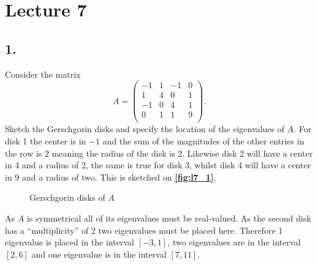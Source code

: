 \section*{Lecture 7}

\subsection*{1.} Consider the matrix
\[ 
A = \begin{pmatrix}
-1 & 1 & -1 & 0\\
1 & 4 & 0 & 1\\
-1 & 0 & 4 & 1\\
0 & 1 & 1 & 9\\
\end{pmatrix}
.\]
Sketch the Gerschgorin disks and specify the location of the eigenvalues of $A$.
\bigbreak
For disk 1 the center is in $-1$ and the sum of the magnitudes of the other entries in the row is $2$ meaning the radius of the disk is 2. Likewise disk 2 will have a center in 4 and a radius of 2, the same is true for disk 3, whilst disk 4 will have a center in $9$ and a radius of two. This is sketched on \textbf{\autoref{fig:l7_1}}.

\begin{figure} [ht]
  \centering
  \caption{Gerschgorin disks of $A$}
  \label{fig:l7_1}
\end{figure}
As $A$ is symmetrical all of its eigenvalues must be real-valued. As the second disk has a ``multiplicity'' of 2 two eigenvalues must be placed here. Therefore 1 eigenvalue is placed in the interval $[-3, 1]$, two eigenvalues are in the interval $[2,6]$ and one eigenvalue is in the interval $[7,11]$. 

